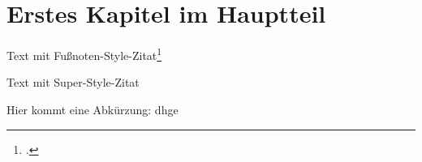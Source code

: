 \section{Erstes Kapitel im Hauptteil}
Text mit Fußnoten-Style-Zitat\footcite{Xarticle}

Text mit Super-Style-Zitat\supercite{Xarticle}

Hier kommt eine Abkürzung: \ac{dhge}
